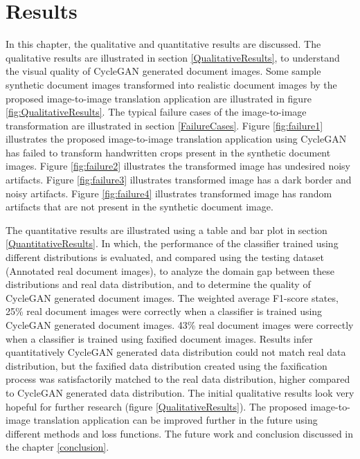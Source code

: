 \section{Results}\label{results}

In this chapter, the qualitative and quantitative results are discussed. The qualitative results are illustrated in section \ref{QualitativeResults}, to understand the visual quality of \ac{CycleGAN} generated document images. Some sample synthetic document images transformed into realistic document images by the proposed image-to-image translation application are illustrated in figure \ref{fig:QualitativeResults}. The typical failure cases of the image-to-image transformation are illustrated in section \ref{FailureCases}. Figure \ref{fig:failure1} illustrates the proposed image-to-image translation application using \ac{CycleGAN} has failed to transform handwritten crops present in the synthetic document images. Figure \ref{fig:failure2} illustrates the transformed image has undesired noisy artifacts. Figure \ref{fig:failure3} illustrates transformed image has a dark border and noisy artifacts. Figure \ref{fig:failure4} illustrates transformed image has random artifacts that are not present in the synthetic document image.

The quantitative results are illustrated using a table and bar plot in section \ref{QuantitativeResults}. In which, the performance of the classifier trained using different distributions is evaluated, and compared using the testing dataset (Annotated real document images), to analyze the domain gap between these distributions and real data distribution, and to determine the quality of \ac{CycleGAN} generated document images. The weighted average F1-score states, 25\% real document images were correctly when a classifier is trained using \ac{CycleGAN} generated document images. 43\% real document images were correctly when a classifier is trained using faxified document images. Results infer quantitatively \ac{CycleGAN} generated data distribution could not match real data distribution, but the faxified data distribution created using the faxification process was satisfactorily matched to the real data distribution, higher compared to \ac{CycleGAN} generated data distribution. The initial qualitative results look very hopeful for further research (figure \ref{QualitativeResults}). The proposed image-to-image translation application can be improved further in the future using different methods and loss functions. The future work and conclusion discussed in the chapter \ref{conclusion}.

